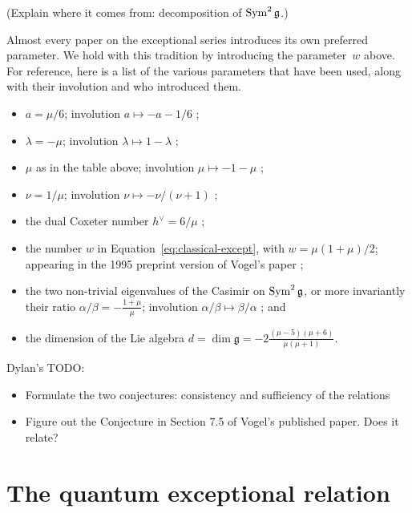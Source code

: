 \documentclass[12pt]{amsart}
\begin{document}
(Explain where it comes from: decomposition of $\operatorname{Sym}^2{\mathfrak g}$.)

\begin{remark}
  Almost every paper on the exceptional series introduces its own
  preferred parameter. We hold with this tradition by introducing the
  parameter~$w$ above. For reference, here is a list of the various
  parameters that have been used, along with their involution and who
  introduced them.
  \begin{itemize}
  \item $a = \mu/6$; involution $a \mapsto -a-1/6$ \cite{MR1378507};
  \item $\lambda = -\mu$; involution $\lambda \mapsto 1-\lambda$ \cite{MR1378507};
  \item $\mu$ as in the table above; involution $\mu \mapsto -1-\mu$ \cite{MR1411045};
  \item $\nu = 1/\mu$; involution $\nu \mapsto -\nu/(\nu+1)$
    \cite{MR1952563};
  \item the dual Coxeter number $h^\vee = 6/\mu$
    \cite{MR1952563};
  \item the number $w$ in Equation~\eqref{eq:classical-except}, with
    $w=\mu(1+\mu)/2$; appearing in the 1995 preprint
    version of Vogel's paper \cite{MR2769234};
  \item the two non-trivial eigenvalues of the Casimir on $\operatorname{Sym}^2
    {\mathfrak g}$, or more invariantly their ratio $\alpha/\beta =
    -\frac{1+\mu}{\mu}$; involution $\alpha/\beta \mapsto
    \beta/\alpha$ \cite{MR2769234}; and
  \item the dimension of the Lie algebra $d = \dim \mathfrak{g} =
    -2\frac{(\mu-5)(\mu+6)}{\mu(\mu+1)}$.
  \end{itemize}
\end{remark}

Dylan's TODO:
\begin{itemize}
\item Formulate the two conjectures: consistency and sufficiency of
  the relations
\item Figure out the Conjecture in Section 7.5 of Vogel's published
  paper. Does it relate?
\end{itemize}

\section{The quantum exceptional relation}
\label{sec:relation}
\end{document}
